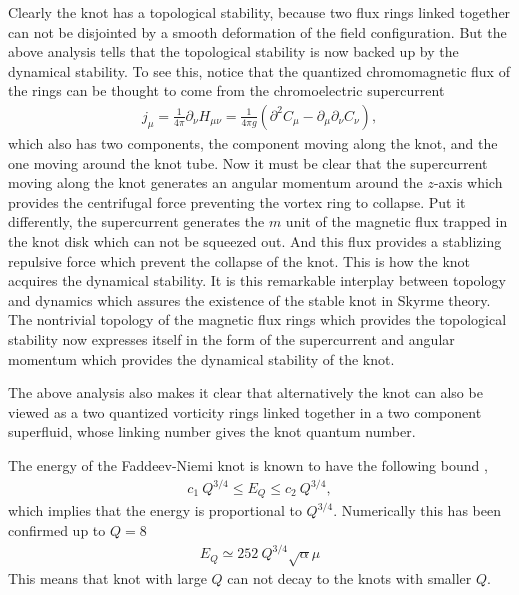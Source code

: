 \documentclass[twocolumn,showpacs,showkeys]{revtex4}
\newcommand{\bea}{\begin{eqnarray}}
\newcommand{\eea}{\end{eqnarray}}
\newcommand{\pro}{\partial}
\newcommand{\dfrac}{\displaystyle\frac}
\begin{document}
Clearly the knot has a topological stability, because two
flux rings linked together can not be disjointed by a smooth
deformation of the field configuration. 
But the above analysis tells that
the topological stability is now
backed up by the dynamical stability. To see this,
notice that the quantized chromomagnetic flux of the rings
can be thought to come from the
chromoelectric supercurrent
\bea
j_\mu = \dfrac{1}{4\pi} \pro_\nu H_{\mu\nu}
= \dfrac{1}{4\pi g} (\pro^2 C_\mu - \pro_\mu \pro_\nu C_\nu),
\label{qc}
\eea
which also has two components, the component
moving along the knot, and the one moving around
the knot tube.
Now it must be clear that the supercurrent
moving along the knot generates an angular momentum
around the $z$-axis which provides the centrifugal force
preventing the vortex ring to collapse.
Put it differently, the supercurrent generates the $m$ unit of
the magnetic flux trapped in the knot disk
which can not be squeezed out. And this flux provides
a stablizing repulsive force which prevent the collapse of the knot.
This is how the knot acquires the dynamical stability.
It is this remarkable interplay between topology
and dynamics which assures the existence of the stable knot
in Skyrme theory. The nontrivial topology
of the magnetic flux rings which provides
the topological stability now expresses itself
in the form of the supercurrent and angular momentum
which provides the dynamical stability of the knot.

The above analysis also makes it clear that alternatively
the knot can also be viewed as a two quantized vorticity rings
linked together in a two component superfluid, whose
linking number gives the knot quantum number.

The energy of the Faddeev-Niemi knot is known to have
the following bound \cite{ussr},
\bea
c_1~Q^{3/4} \leq E_Q \leq c_2~Q^{3/4},
\eea
which implies that the energy is proportional to $Q^{3/4}$.
Numerically this has been confirmed up to $Q=8$ \cite{batt}
\bea
E_Q \simeq 252~Q^{3/4} \sqrt \alpha \mu
\eea
This means that knot with large $Q$ can not decay to
the knots with smaller $Q$. 
\end{document}
